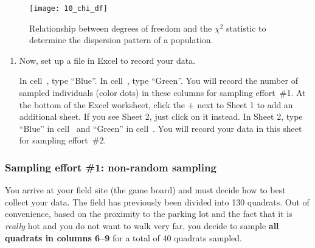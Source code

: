 \documentclass[12pt, hidelinks]{exam}
\newcommand\chisq{$\chi^2$}
\newcommand*\xcell[1]{cell~\liningnum{#1}}
\begin{document}
\begin{figure}[h!]
	\begin{center}
	\captionsetup{width=0.5\textwidth}
	\texttt{[image: 10\_chi\_df]}
	\caption{Relationship between degrees of freedom and the \chisq{}
statistic to determine the dispersion pattern of a
population.}\label{fig:chi_df}
	\end{center}
\end{figure}

\begin{enumerate}[resume]

\item Now, set up a file in Excel to record your data.

In \xcell{A1}, type “Blue”. In \xcell{D1}, type “Green”. You will record the number of sampled individuals (color dots) in these columns for sampling effort~\#1. At the bottom of the Excel worksheet, click the $+$ next to Sheet 1 to add an additional sheet. If you see Sheet 2, just click on it instead. In Sheet 2,
type “Blue” in \xcell{A1} and “Green” in \xcell{D1}. You will record your data
in this sheet for sampling effort~\#2.

\end{enumerate}

\subsubsection*{Sampling effort \#1: non-random sampling}

You arrive at your field site (the game board) and must decide
how to best collect your data. The field has previously been divided
into 130 quadrats. Out of convenience, based on the proximity to the
parking lot and the fact that it is \emph{really} hot and you do not want to
walk very far, you decide to sample \textbf{all quadrats in columns 6–9}
for a total of 40 quadrats sampled. 
\end{document}

